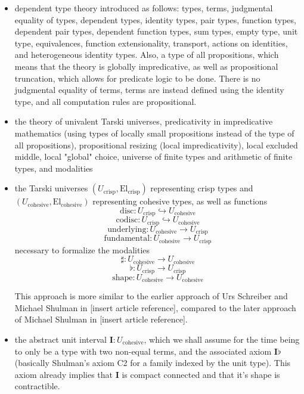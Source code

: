 \documentclass[one]{article}
\begin{document}
\begin{itemize}
\item dependent type theory introduced as follows: types, terms, judgmental equality of types, dependent types, identity types, pair types, function types, dependent pair types, dependent function types, sum types, empty type, unit type, equivalences, function extensionality, transport, actions on identities, and heterogeneous identity types. Also, a type of all propositions, which means that the theory is globally impredicative, as well as propositional truncation, which allows for predicate logic to be done. There is no judgmental equality of terms, terms are instead defined using the identity type, and all computation rules are propositional. 

\item the theory of univalent Tarski universes, predicativity in impredicative mathematics (using types of locally small propositions instead of the type of all propositions), propositional resizing (local impredicativity), local excluded middle, local "global" choice, universe of finite types and arithmetic of finite types, and modalities

\item the Tarski universes $(U_\mathrm{crisp}, \mathrm{El}_\mathrm{crisp})$ representing crisp types and $(U_\mathrm{cohesive}, \mathrm{El}_\mathrm{cohesive})$ representing cohesive types, as well as functions 
$$\mathrm{disc}:U_\mathrm{crisp} \hookrightarrow U_\mathrm{cohesive}$$ 
$$\mathrm{codisc}:U_\mathrm{crisp} \hookrightarrow U_\mathrm{cohesive}$$
$$\mathrm{underlying}:U_\mathrm{cohesive} \to U_\mathrm{crisp}$$ 
$$\mathrm{fundamental}:U_\mathrm{cohesive} \to U_\mathrm{crisp}$$ 
necessary to formalize the modalities 
$$\sharp:U_\mathrm{cohesive} \to U_\mathrm{cohesive}$$
$$\flat:U_\mathrm{crisp} \to U_\mathrm{crisp}$$
$$\mathrm{shape}:U_\mathrm{cohesive} \to U_\mathrm{cohesive}$$

This approach is more similar to the earlier approach of Urs Schreiber and Michael Shulman in [insert article reference], compared to the later approach of Michael Shulman in [insert article reference]. 

\item the abstract unit interval $\mathbf{I}:U_\mathrm{cohesive}$, which we shall assume for the time being to only be a type with two non-equal terms, and the associated axiom $\mathbf{I} \flat$ (basically Shulman's axiom C2 for a family indexed by the unit type). This axiom already implies that $\mathbf{I}$ is compact connected and that it's shape is contractible. 

\end{itemize}
\end{document}
